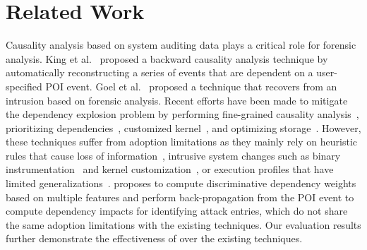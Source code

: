 
\section{Related Work}
\label{sec:literature}



%
Causality analysis based on system auditing data plays a critical role for forensic analysis.
King et al.~\cite{backtracking,backtracking2} proposed a backward causality analysis technique by automatically reconstructing a series of events that are dependent on a user-specified POI event.
Goel et al.~\cite{taser} proposed a technique that recovers from an intrusion based on forensic analysis.
Recent efforts have been made to mitigate the dependency explosion problem by performing fine-grained causality analysis~\cite{beep,ma2016protracer,mcitracking,ji2017rain,ji2018enabling}, prioritizing dependencies~\cite{liu2018priotracker,hassan2019nodoze}, customized kernel~\cite{trustkernel}, and optimizing storage~\cite{loggc,reduction,reduction2,reduction3}. 
However, these techniques suffer from adoption limitations as they mainly rely on heuristic rules that cause loss of information~\cite{backtracking}, intrusive system changes such as binary instrumentation~\cite{ma2016protracer,mcitracking} and kernel customization~\cite{trustkernel}, or execution profiles that have limited generalizations~\cite{hassan2019nodoze}.
\tool proposes to compute discriminative dependency weights based on multiple features and perform back-propagation from the POI event to compute dependency impacts for identifying attack entries, which do not share the same adoption limitations with the existing techniques. 
Our evaluation results further demonstrate the effectiveness of \tool over the existing techniques.


